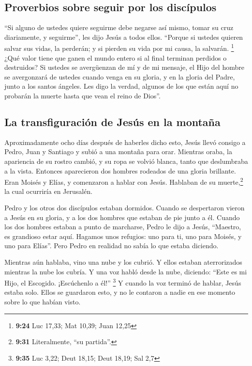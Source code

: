 \hypertarget{proverbios-sobre-seguir-por-los-discuxedpulos}{%
\subsection{Proverbios sobre seguir por los
discípulos}\label{proverbios-sobre-seguir-por-los-discuxedpulos}}

 ``Si alguno de ustedes quiere seguirme debe negarse así
mismo, tomar su cruz diariamente, y seguirme'', les dijo Jesús a todos
ellos.  ``Porque si ustedes quieren salvar sus vidas, la
perderán; y si pierden su vida por mi causa, la salvarán. \footnote{\textbf{9:24}
  Luc 17,33; Mat 10,39; Juan 12,25}  ¿Qué valor tiene que
ganen el mundo entero si al final terminan perdidos o destruidos?
 Si ustedes se avergüenzan de mí y de mi mensaje, el Hijo
del hombre se avergonzará de ustedes cuando venga en su gloria, y en la
gloria del Padre, junto a los santos ángeles.  Les digo
la verdad, algunos de los que están aquí no probarán la muerte hasta que
vean el reino de Dios''.

\hypertarget{la-transfiguraciuxf3n-de-jesuxfas-en-la-montauxf1a}{%
\subsection{La transfiguración de Jesús en la
montaña}\label{la-transfiguraciuxf3n-de-jesuxfas-en-la-montauxf1a}}

 Aproximadamente ocho días después de haberles dicho
esto, Jesús llevó consigo a Pedro, Juan y Santiago y subió a una montaña
para orar.  Mientras oraba, la apariencia de su rostro
cambió, y su ropa se volvió blanca, tanto que deslumbraba a la vista.
 Entonces aparecieron dos hombres rodeados de una gloria
brillante. Eran Moisés y Elías, y comenzaron a hablar con Jesús.
 Hablaban de su muerte,\footnote{\textbf{9:31}
  Literalmente, ``su partida''.} la cual ocurriría en Jerusalén.

 Pedro y los otros dos discípulos estaban dormidos.
Cuando se despertaron vieron a Jesús en su gloria, y a los dos hombres
que estaban de pie junto a él.  Cuando los dos hombres
estaban a punto de marcharse, Pedro le dijo a Jesús, ``Maestro, es
grandioso estar aquí. Hagamos unos refugios: uno para ti, uno para
Moisés, y uno para Elías''. Pero Pedro en realidad no sabía lo que
estaba diciendo.

 Mientras aún hablaba, vino una nube y los cubrió. Y
ellos estaban aterrorizados mientras la nube los cubría. 
Y una voz habló desde la nube, diciendo: ``Este es mi Hijo, el Escogido.
¡Escúchenlo a él!'' \footnote{\textbf{9:35} Luc 3,22; Deut 18,15; Deut
  18,19; Sal 2,7}  Y cuando la voz terminó de hablar,
Jesús estaba solo. Ellos se guardaron esto, y no le contaron a nadie en
ese momento sobre lo que habían visto.

